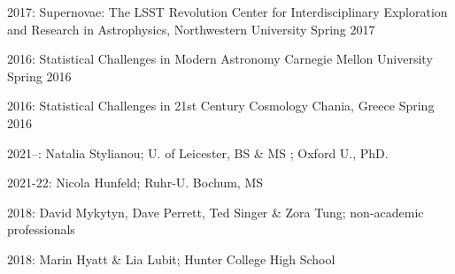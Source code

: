 \documentclass[11pt,letterpaper]{article}
\begin{document}
\begin{list}{}{\malzlist}
\item 2017: 
	{Supernovae: The LSST Revolution}
	{Center for Interdisciplinary Exploration and Research in Astrophysics, Northwestern University}
	{Spring 2017}
\item 2016: 
	{Statistical Challenges in Modern Astronomy}
	{Carnegie Mellon University}
	{Spring 2016}
\item 2016: 
	{Statistical Challenges in 21st Century Cosmology}
	{Chania, Greece}
	{Spring 2016}
\end{list}
%
%
\clearpage

\begin{list}{}{\malzlist}
	\item 2021--: Natalia Stylianou; U. of Leicester, BS \& MS ; Oxford U., PhD. 
	\item 2021-22: Nicola Hunfeld; Ruhr-U. Bochum, MS 
	\item 2018: David Mykytyn, Dave Perrett, Ted Singer \& Zora Tung; non-academic professionals
	\item 2018: Marin Hyatt \& Lia Lubit; Hunter College High School 
\end{list}
\end{document}
